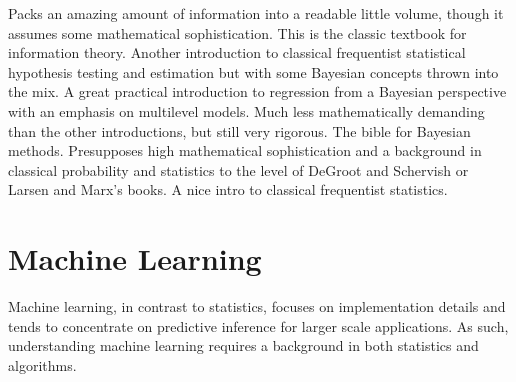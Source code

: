\begin{itemize}
%
{Packs an amazing amount of information into
a readable little volume, though it assumes some mathematical
sophistication.}
%
{This is the classic textbook for information theory.}
%
{Another introduction to classical frequentist
statistical hypothesis testing and estimation but with some Bayesian
concepts thrown into the mix.}
%
{A great practical introduction to regression from a Bayesian
perspective with an emphasis on multilevel models.  Much less mathematically
demanding than the other introductions, but still very rigorous.}
%
{The bible for Bayesian methods.  Presupposes high
mathematical sophistication and a background in classical probability
and statistics to the level of DeGroot and Schervish or Larsen
and Marx's books.}
%
{A nice intro to classical frequentist statistics.}
%
\end{itemize}


\section{Machine Learning}

\noindent
Machine learning, in contrast to statistics, focuses on implementation
details and tends to concentrate on predictive inference for larger
scale applications.  As such, understanding machine learning requires
a background in both statistics and algorithms.

